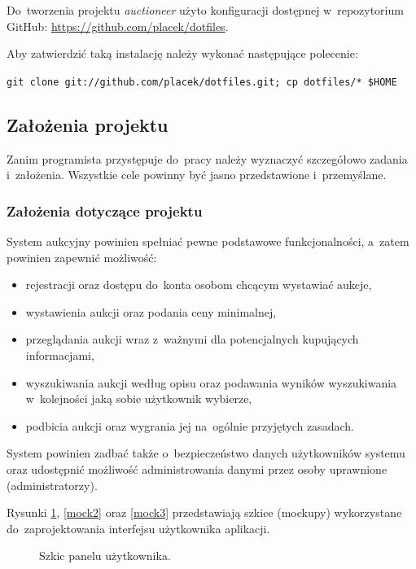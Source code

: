 Do~tworzenia projektu \textit{auctioneer} użyto konfiguracji dostępnej w~repozytorium GitHub: \url{https://github.com/placek/dotfiles}.


Aby zatwierdzić taką instalację należy wykonać następujące polecenie:


\texttt{git clone git://github.com/placek/dotfiles.git; cp dotfiles/* \$HOME}

\subsection{Założenia projektu}

Zanim programista przystępuje do~pracy należy wyznaczyć szczegółowo zadania i~założenia. Wszystkie cele powinny być jasno przedstawione i~przemyślane.

\subsubsection{Założenia dotyczące projektu}

System aukcyjny powinien spełniać pewne podstawowe funkcjonalności, a~zatem powinien zapewnić możliwość:

\begin{itemize}
  \item rejestracji oraz dostępu do~konta osobom chcącym wystawiać aukcje,
  \item wystawienia aukcji oraz podania ceny minimalnej,
  \item przeglądania aukcji wraz z~ważnymi dla potencjalnych kupujących informacjami,
  \item wyszukiwania aukcji według opisu oraz podawania wyników wyszukiwania w~kolejności jaką sobie użytkownik wybierze,
  \item podbicia aukcji oraz wygrania jej na~ogólnie przyjętych zasadach.
\end{itemize}

System powinien zadbać także o~bezpieczeństwo danych użytkowników systemu oraz udostępnić możliwość administrowania danymi przez osoby uprawnione (administratorzy).


Rysunki \ref{mock1}, \ref{mock2} oraz \ref{mock3} przedstawiają szkice (mockupy) wykorzystane do~zaprojektowania interfejsu użytkownika aplikacji.

\begin{figure}[h]
\centering
{}
\caption{Szkic panelu użytkownika.}
\label{mock1}
\end{figure}

